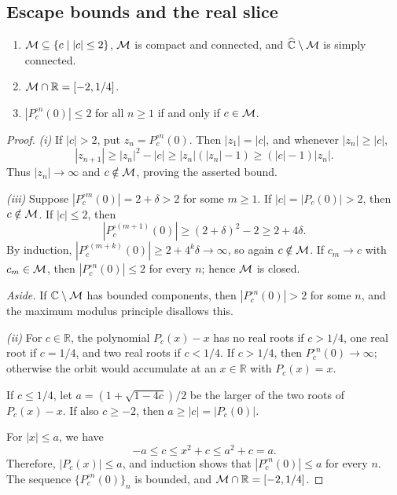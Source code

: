 \documentclass[11pt,a4paper]{article}
\begin{document}
\subsection{Escape bounds and the real slice}
\setcounter{theorem}{2}\begin{theorem}\label{thm:basic-properties}
\begin{enumerate}[label=(\roman*)]
\setcounter{enumi}{0}\item $\mathcal M\subseteq\{c\mid |c|\le2\}$, $\mathcal M$ is compact and connected, and $\widehat{\mathbb C}\setminus\mathcal M$ is simply connected.
\setcounter{enumi}{1}\item $\mathcal M\cap\mathbb R=[-2,1/4]$.
\setcounter{enumi}{2}\item $|P_c^{\circ n}(0)|\le2$ for all $n\ge1$ if and only if $c\in\mathcal M$.
\end{enumerate}
\end{theorem}

\begin{proof}
\textit{(i)} If $|c|>2$, put $z_n=P_c^{\circ n}(0)$. Then $|z_1|=|c|$, and whenever $|z_n|\ge |c|$,
\[
|z_{n+1}|\ge |z_n|^2-|c|
\ge |z_n|(|z_n|-1)
\ge (|c|-1)|z_n|.
\]
Thus $|z_n|\to\infty$ and $c\notin\mathcal M$, proving the asserted bound.

\textit{(iii)} Suppose $|P_c^{\circ m}(0)|=2+\delta>2$ for some $m\ge1$. If $|c|=|P_c(0)|>2$, then $c\notin\mathcal M$. If $|c|\le2$, then
\[
|P_c^{\circ(m+1)}(0)|\ge(2+\delta)^2-2\ge2+4\delta.
\]
By induction, $|P_c^{\circ(m+k)}(0)|\ge2+4^k\delta\to\infty$, so again $c\notin\mathcal M$. If $c_m\to c$ with $c_m\in\mathcal M$, then $|P_c^{\circ n}(0)|\le2$ for every $n$; hence $\mathcal M$ is closed.

\emph{Aside.} If $\mathbb{C}\setminus\mathcal M$ has bounded components, then $|P_c^{\circ n}(0)|>2$ for some $n$, and the maximum modulus principle disallows this.

\textit{(ii)} For $c\in\mathbb R$, the polynomial $P_c(x)-x$ has no real roots if $c>1/4$, one real root if $c=1/4$, and two real roots if $c<1/4$. If $c>1/4$, then $P_c^{\circ n}(0)\to\infty$; otherwise the orbit would accumulate at an $x\in\mathbb R$ with $P_c(x)=x$.

If $c\le1/4$, let $a=(1+\sqrt{1-4c})/2$ be the larger of the two roots of $P_c(x)-x$. If also $c\ge-2$, then $a\ge|c|=|P_c(0)|$.

For $|x|\le a$, we have
\[
-a\le c\le x^2+c\le a^2+c=a.
\]
Therefore, $|P_c(x)|\le a$, and induction shows that $|P_c^{\circ n}(0)|\le a$ for every $n$. The sequence $\{P_c^{\circ n}(0)\}_n$ is bounded, and $\mathcal M\cap\mathbb R=[-2,1/4]$.
\end{proof}
\end{document}
